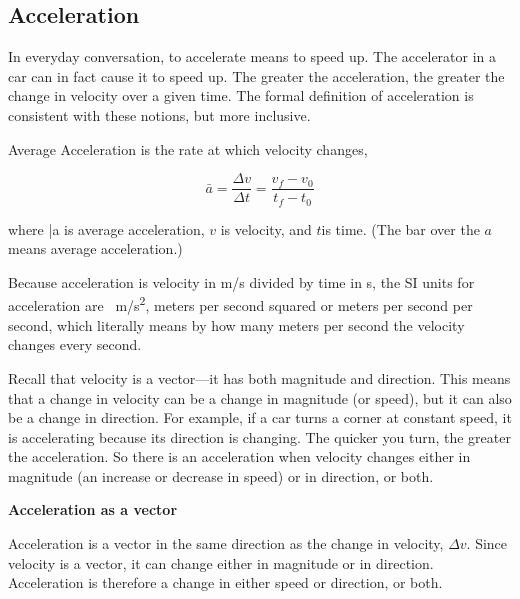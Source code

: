 \documentclass[main-ap-physics.tex]{subfiles}
\begin{document}
\subsection{Acceleration}


In everyday conversation, to accelerate means to speed up. The accelerator in a car can in fact cause it to speed up. The greater the acceleration, the greater the change in velocity over a given time. The formal definition of acceleration is consistent with these notions, but more inclusive.

\begin{mdframed}[backgroundcolor=black!10]
    Average Acceleration is the rate at which velocity changes,

    \begin{equation}
        \bar{a} = \frac{\Delta v}{\Delta t} = \frac{v_f - v_0}{t_f - t_0} 
    \end{equation}

    where \bar{a} is average acceleration, $v$ is velocity, and $t$is time. (The bar over the $a$ means average acceleration.)
\end{mdframed}

Because acceleration is velocity in m/s divided by time in s, the SI units for acceleration are \SI{}{m/s^2}, meters per second squared or meters per second per second, which literally means by how many meters per second the velocity changes every second.

\vspace{1em}

Recall that velocity is a vector---it has both magnitude and direction. This means that a change in velocity can be a change in magnitude (or speed), but it can also be a change in direction. For example, if a car turns a corner at constant speed, it is accelerating because its direction is changing. The quicker you turn, the greater the acceleration. So there is an acceleration when velocity changes either in magnitude (an increase or decrease in speed) or in direction, or both.

\begin{mdframed}[backgroundcolor=black!10]
    \textbf{Acceleration as a vector}

    \vspace{1ex}

    Acceleration is a vector in the same direction as the change in velocity, $Δv$. Since velocity is a vector, it can change either in magnitude or in direction. Acceleration is therefore a change in either speed or direction, or both.
\end{mdframed}
\end{document}
